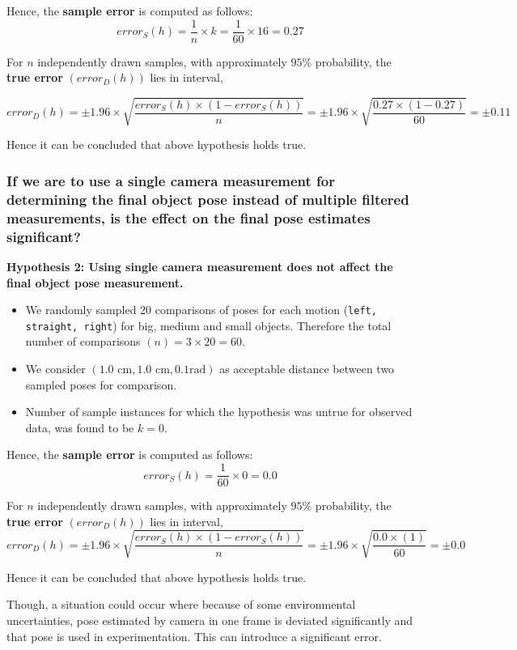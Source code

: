 Hence, the \textbf{sample error} is computed as follows:
$$\boxed{error_{S}(h) = \frac{1}{n} \times k = \frac{1}{60} \times 16 = 0.27}$$

For $n$ independently drawn samples, with approximately $95\%$ probability, the \textbf{true error} $(error_{D}(h))$ lies in interval,

$$\boxed{error_{D}(h) = \pm 1.96 \times \sqrt{\frac{error_{S}(h) \times (1 - error_{S}(h))}{n}} = \pm 1.96 \times \sqrt{\frac{0.27 \times (1 - 0.27)}{60}} = \pm 0.11}$$

Hence it can be concluded that above hypothesis holds true. 



\subsubsection{If we are to use a single camera measurement for determining the final object pose instead of multiple filtered measurements, is the effect on the final pose estimates significant?}
\textbf{Hypothesis 2: Using single camera measurement does not affect the final object pose measurement.}
\begin{itemize}
\item We randomly sampled 20 comparisons of poses for each motion (\texttt{left, straight, right}) for big, medium and small objects. Therefore the total number of comparisons $(n) = 3 \times 20 =  60$.
\item We consider $(1.0 \text{ cm}, 1.0 \text{ cm}, 0.1 \text{rad})$ as acceptable distance between two sampled poses for comparison.
\item Number of sample instances for which the hypothesis was untrue for observed data, was found to be $k = 0$.
\end{itemize}

Hence, the \textbf{sample error} is computed as follows:
$$\boxed{error_{S}(h) = \frac{1}{60} \times 0 = 0.0}$$

For $n$ independently drawn samples, with approximately $95\%$ probability, the \textbf{true error} $(error_{D}(h))$ lies in interval,
$$\boxed{error_{D}(h) = \pm 1.96 \times \sqrt{\frac{error_{S}(h) \times (1 - error_{S}(h))}{n}} = \pm 1.96 \times \sqrt{\frac{0.0 \times (1)}{60}} = \pm 0.0}$$

Hence it can be concluded that above hypothesis holds true. 

Though, a situation could occur where because of some environmental uncertainties, pose estimated by camera in one frame is deviated significantly and that pose is used in experimentation. This can introduce a significant error. 

